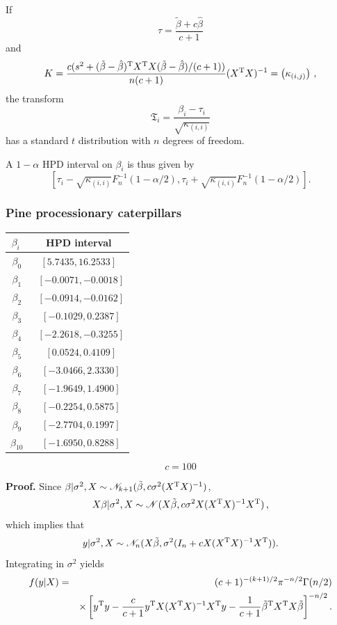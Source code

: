 \begin{slide}
\end{slide}\begin{slide}

If
$$
\tau=\frac{\tilde\beta+c\hat\beta}{c+1}$$
and
$$
K=\frac{c(s^2+(\tilde\beta-\hat\beta)^{\mathrm{T}} X^{\mathrm{T}} X(\tilde\beta-\hat\beta)/(c+1))}{n(c+1)}(X^{\mathrm{T}} X)^{-1}
 =\left( \kappa_{(i,j)} \right)\,,
$$
the transform
$$
\mathfrak{T}_i = \frac{\beta_i-\tau_i}{\sqrt{\kappa_{(i,i)}}}
$$
has a standard $t$ distribution with $n$ degrees of freedom. 

\end{slide}\begin{slide}

A $1-\alpha$ HPD 
interval on $\beta_i$ is thus given by
$$
\left[\tau_i-\sqrt{\kappa_{(i,i)}}F_{n}^{-1}(1-\alpha/2),\tau_i+\sqrt{\kappa_{(i,i)}}F_{n}^{-1}(1-\alpha/2)\right].
$$

\end{slide}\begin{frame}
\frametitle{Pine processionary caterpillars}

\begin{center}
\begin{tabular}{c|c}
 $\beta_i\ $ & HPD interval\\
 \hline $\beta_0$ & $[5.7435,16.2533]$ \\
 $\beta_1$ & \ $[-0.0071,-0.0018]$ \\
 $\beta_2$ & \ $[-0.0914,-0.0162]$ \\
 $\beta_3$ & \ $[-0.1029,0.2387]$ \\
 $\beta_4$ & \ $[-2.2618,-0.3255]$ \\
 $\beta_5$ & \ $[0.0524,0.4109]$ \\
 $\beta_6$ & \ $[-3.0466,2.3330]$ \\
 $\beta_7$ & \ $[-1.9649,1.4900]$ \\
 $\beta_8$ & \ $[-0.2254,0.5875]$ \\
 $\beta_9$ & \ $[-2.7704,0.1997]$ \\
 $\beta_{10}$ & \ $[-1.6950,0.8288]$
\end{tabular}
\end{center}
$$
c=100
$$
\end{frame}\begin{slide}

\vs\small
{\bf Proof.} Since $\beta|\sigma^2,X\sim\mathscr{N}_{k+1}(\tilde\beta,c\sigma^2(X^{\mathrm{T}} X)^{-1})$, 
$$
X\beta|\sigma^2,X\sim\mathscr{N}(X\tilde\beta,c\sigma^2X(X^{\mathrm{T}} X)^{-1}X^{\mathrm{T}} )\,,
$$
which implies that
$$
y|\sigma^2,X\sim\mathscr{N}_n(X\tilde\beta,\sigma^2(I_n+cX(X^{\mathrm{T}} X)^{-1}X^{\mathrm{T}} )).
$$
Integrating in $\sigma^2$ yields
\begin{eqnarray*}
f(y|X) & = & (c+1)^{-(k+1)/2}\pi^{-n/2}\Gamma(n/2) \\
       &   &\times \left[y^{\mathrm{T}} y-\frac{c}{c+1}y^{\mathrm{T}} X(X^{\mathrm{T}} X)^{-1}X^{\mathrm{T}} y-\frac{1}{c+1}\tilde\beta^{\mathrm{T}} 
		X^{\mathrm{T}} X\tilde\beta\right]^{-n/2}.
\end{eqnarray*}
\normalsize


\end{slide}
